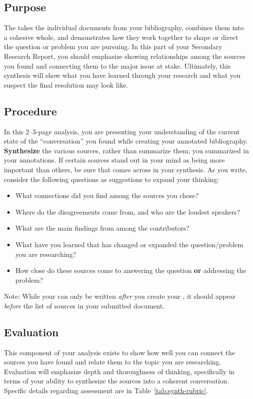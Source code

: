 \documentclass[11pt, twosides]{amsart}	%
\begin{document}
\subsection{Purpose} %
\label{sec:synth-purpose}
The  takes the individual documents from your bibliography, combines them into a cohesive whole, and demonstrates how they work together to shape or direct the question or problem you are pursuing. In this part of your Secondary Research Report, you should emphasize showing relationships among the sources you found and connecting them to the major issue at stake. Ultimately, this synthesis will show what you have learned through your research and what you suspect the final resolution may look like.

\subsection{Procedure} %
\label{sec:synth-procedure}
In this 2–3-page analysis, you are presenting your understanding of the current state of the “conversation” you found while creating your annotated bibliography. \textbf{Synthesize} the various sources, rather than summarize them; you summarized in your annotations. If certain sources stand out in your mind as being more important than others, be sure that comes across in your synthesis. As you write, consider the following questions as suggestions to expand your thinking:
\begin{itemize}
	\item What connections did you find among the sources you chose?
	\item Where do the disagreements come from, and who are the loudest speakers?
	\item What are the main findings from among the contributors?
	\item  What have you learned that has changed or expanded the question/problem you are researching?
	\item  How close do these sources come to answering the question \textbf{or} addressing the problem?
\end{itemize}

Note: While your  can only be written \emph{after} you create your , it should appear \emph{before} the list of sources in your submitted document.

\subsection{Evaluation} %
\label{sec:synth-rubric}
This component of your analysis exists to show how well you can connect the sources you have found and relate them to the topic you are researching. Evaluation will emphasize depth and thoroughness of thinking, specifically in terms of your ability to synthesize the sources into a coherent conversation. Specific details regarding assessment are in Table~\ref{tab:synth-rubric}.
\end{document}

